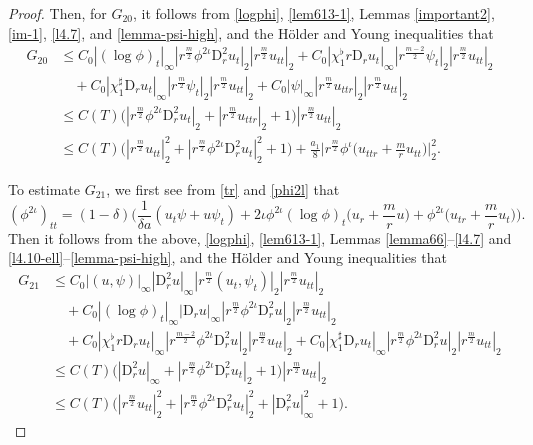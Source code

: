 \documentclass[11pt,reqno]{amsart}
\numberwithin{rk}{section}
\numberwithin{prop}{section}
\numberwithin{mydef}{section}
\numberwithin{lem}{section}
\numberwithin{equation}{section}
\numberwithin{thm}{section}
\begin{document}
\begin{proof}
Then, for $G_{20}$, it follows from \eqref{logphi}, \eqref{lem613-1}, 
Lemmas \ref{important2}, \ref{im-1}, \ref{l4.7}, and \ref{lemma-psi-high}, and the H\"older and Young inequalities that
\begin{equation} 
\begin{aligned}
G_{20}&\leq C_0|(\log\phi)_t|_\infty|r^\frac{m}{2}\phi^{2\iota}\mathrm{D}_r^2 u_t|_2|r^\frac{m}{2}u_{tt}|_2+C_0|\chi_1^\flat r\mathrm{D}_r u_t|_\infty |r^\frac{m-2}{2}\psi_t|_2|r^\frac{m}{2}u_{tt}|_2\\
&\quad +C_0|\chi_1^\sharp \mathrm{D}_r u_t|_\infty |r^\frac{m}{2}\psi_t|_2|r^\frac{m}{2}u_{tt}|_2+C_0|\psi|_\infty |r^\frac{m}{2}u_{ttr}|_2|r^\frac{m}{2}u_{tt}|_2\\
&\leq C(T) \big(|r^\frac{m}{2}\phi^{2\iota}\mathrm{D}_r^2 u_t|_2+|r^\frac{m}{2}u_{ttr}|_2+1\big)|r^\frac{m}{2}u_{tt}|_2\\
&\leq C(T)\big(|r^\frac{m}{2}u_{tt}|_2^2+|r^\frac{m}{2}\phi^{2\iota}\mathrm{D}_r^2 u_t|_2^2+1\big)+\frac{a_1}{8} \Big|r^\frac{m}{2}\phi^\iota\big(u_{ttr}+\frac{m}{r}u_{tt}\big)\Big|_2^2.
\end{aligned}
\end{equation}

To estimate $G_{21}$, we first see from \eqref{tr} and \eqref{phi2l} that
\begin{equation*} 
(\phi^{2\iota})_{tt}=(1-\delta)\Big(\frac{1}{\delta a} (u_t \psi+u\psi_t)+ 2\iota \phi^{2\iota}(\log\phi)_t\big(u_{r}+\frac{m}{r}u\big)+ \phi^{2\iota}\big(u_{tr}+\frac{m}{r}u_t\big)\Big).
\end{equation*}
Then it follows from the above, \eqref{logphi}, \eqref{lem613-1}, 
Lemmas \ref{lemma66}--\ref{l4.7} and \ref{l4.10-ell}--\ref{lemma-psi-high}, and the H\"older and Young inequalities that
\begin{equation} 
\begin{aligned}
G_{21} &\leq C_0|(u,\psi)|_\infty|\mathrm{D}_r^2 u|_\infty|r^\frac{m}{2}(u_t,\psi_t)|_2|r^\frac{m}{2}u_{tt}|_2\\
&\quad +C_0|(\log\phi)_t|_\infty|\mathrm{D}_r u|_\infty |r^\frac{m}{2}\phi^{2\iota}\mathrm{D}_r^2 u|_2|r^\frac{m}{2}u_{tt}|_2\\
&\quad +C_0|\chi_1^\flat r\mathrm{D}_r u_t|_\infty |r^\frac{m-2}{2}\phi^{2\iota}\mathrm{D}_r^2 u|_2|r^\frac{m}{2}u_{tt}|_2 +C_0|\chi_1^\sharp \mathrm{D}_r u_t|_\infty |r^\frac{m}{2}\phi^{2\iota}\mathrm{D}_r^2 u|_2|r^\frac{m}{2}u_{tt}|_2 \\
&\leq C(T) \big(|\mathrm{D}_r^2 u|_\infty+|r^\frac{m}{2}\phi^{2\iota}\mathrm{D}_r^2 u_t|_2 +1\big)|r^\frac{m}{2}u_{tt}|_2\\
&\leq C(T)\big(|r^\frac{m}{2}u_{tt}|_2^2+|r^\frac{m}{2}\phi^{2\iota}\mathrm{D}_r^2 u_t|_2^2+|\mathrm{D}_r^2 u|_\infty^2+1\big).
\end{aligned}
\end{equation}



\end{proof}
\end{document}
